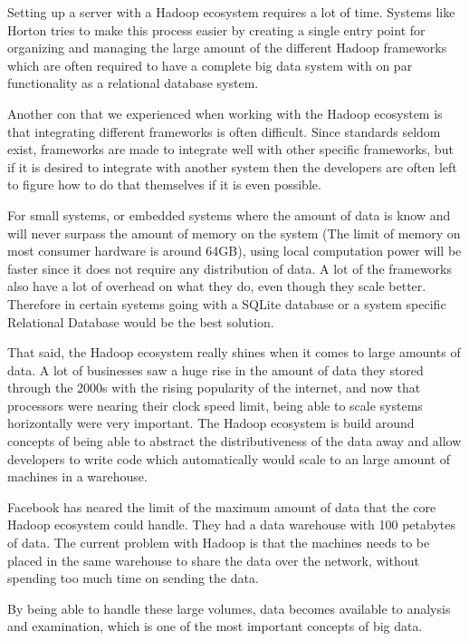 Setting up a server with a Hadoop ecosystem requires a lot of time. Systems like Horton tries to make this process easier by creating a single entry point for organizing and managing the large amount of the different Hadoop frameworks which are often required to have a complete big data system with on par functionality as a relational database system. 

\newpar Another con that we experienced when working with the Hadoop ecosystem is that integrating different frameworks is often difficult. Since standards seldom exist, frameworks are made to integrate well with other specific frameworks, but if it is desired to integrate with another system then the developers are often left to figure how to do that themselves if it is even possible.

\newpar For small systems, or embedded systems where the amount of data is know and will never surpass the amount of memory on the system (The limit of memory on most consumer hardware is around 64GB), using local computation power will be faster since it does not require any distribution of data. A lot of the frameworks also have a lot of overhead on what they do, even though they scale better. Therefore in certain systems going with a SQLite database or a system specific Relational Database would be the best solution. 

\newpar That said, the Hadoop ecosystem really shines when it comes to large amounts of data. A lot of businesses saw a huge rise in the amount of data they stored through the 2000s with the rising popularity of the internet, and now that processors were nearing their clock speed limit, being able to scale systems horizontally were very important. The Hadoop ecosystem is build around concepts of being able to abstract the distributiveness of the data away and allow developers to write code which automatically would scale to an large amount of machines in a warehouse. 

Facebook has neared the limit of the maximum amount of data that the core Hadoop ecosystem could handle. They had a data warehouse with 100 petabytes of data. The current problem with Hadoop is that the machines needs to be placed in the same warehouse to share the data over the network, without spending too much time on sending the data\cite{limit-hadoop}.

By being able to handle these large volumes, data becomes available to analysis and examination, which is one of the most important concepts of big data.

